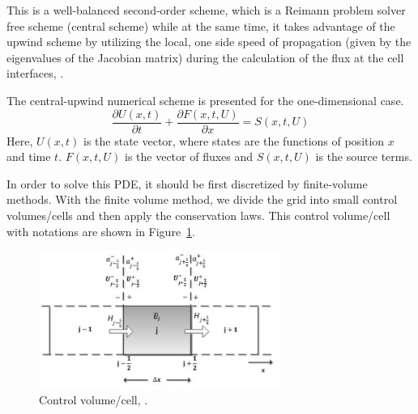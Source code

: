 \documentclass[%
]{USN-PhD}
\begin{document}
This is a well-balanced second-order scheme, which is a Reimann problem solver free scheme (central scheme) while at the same time, it takes advantage of the upwind scheme by utilizing the local, one side speed of propagation (given by the eigenvalues of the Jacobian matrix) during the calculation of the flux at the cell interfaces, \cite{Sha:15}.

The central-upwind numerical scheme is presented for the one-dimensional case.
\begin{equation}
\frac{\partial U\left(x,t\right)}{\partial t}+\frac{\partial F\left(x,t,U\right)}{\partial x}=S\left(x,t,U\right)
\end{equation}
Here, $U\left(x,t\right)$ is the state vector, where states are the functions of position $x$ and time $t$. $F\left(x,t,U\right)$ is the vector of fluxes and $S\left(x,t,U\right)$ is the source terms.

In order to solve this PDE, it should be first discretized by finite-volume methods. With the finite volume method, we divide the grid into small control volumes/cells and then apply the conservation laws. This control volume/cell with notations are shown in Figure~\ref{fig:fig2_1}.
\begin{figure}[!ht]
  \centering
 \includegraphics[width=0.7\textwidth]{fig/kp}
 \caption{Control volume/cell, \cite{Sha:15}.}
  \label{fig:fig2_1}
\end{figure}
\end{document}
